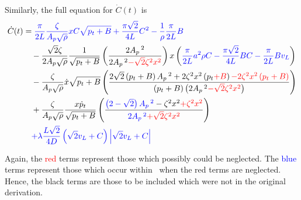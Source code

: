 Similarly, the full equation for $\dot{C}(t)$ is
~
\begin{equation*}
\begin{split}
    \dot{C}(t) &=
    \textcolor{Blue}{
    \frac{\pi}{2L} \frac{\zeta}{A_p \sqrt{\rho}} x C \sqrt{p_t + B}
    + \frac{\pi \sqrt{2}}{4 L} C^2
    - \frac{1}{\rho} \frac{\pi}{2L} B
    } \\ & \quad %
    - \frac{\sqrt{2} \zeta}{2 A_p \sqrt{\rho}} \frac{1}{\sqrt{p_t+B}} \left( \frac{2 A_p\,^2}{2 A_p\,^2 \textcolor{Red}{- \sqrt{2} \zeta^2 x^2}} \right) x \left(
    \textcolor{Blue}{
    \frac{\pi}{2L} a^2 \rho C
    - \frac{\pi \sqrt{2}}{4 L} B C
    - \frac{\pi}{2L} B v_L }
    \right)
    \\ & \quad %
    - \frac{\zeta}{A_p \sqrt{\rho}} \dot{x} \sqrt{p_t + B} \left( 
    \frac{ 2 \sqrt{2} \left( p_t + B \right) A_p\,^2 + 2 \zeta^2 x^2 \left( p_t \textcolor{red}{+ B} \right) \textcolor{Red}{- 2 \zeta^2 x^2 \left( p_t + B \right)} }
    { \left( p_t + B \right) \left( 2 A_p\,^2 \textcolor{Red}{- \sqrt{2} \zeta^2 x^2} \right) }
    \right)
    \\ & \quad %
    + \frac{\zeta}{A_p \sqrt{\rho}} \frac{x \dot{p}_t}{\sqrt{p_t+B}} \left( \frac{
    \textcolor{Blue}{\left( 2 - \sqrt{2} \right) A_p\,^2}
    - \zeta^2 x^2 \textcolor{Red}{+ \zeta^2 x^2}}{
    \textcolor{Blue}{2 A_p\,^2}
    \textcolor{Red}{+ \sqrt{2} \zeta^2 x^2}} \right)
    \\ & \quad %
    \textcolor{Blue}{
    + \lambda \frac{L \sqrt{2}}{4 D} \left( \sqrt{2} v_L + C \right) \left| \sqrt{2} v_L + C \right| }
\end{split}
\end{equation*}

Again, the \textcolor{Red}{red} terms represent those which possibly could be neglected. The \textcolor{Blue}{blue} terms represent those which occur within~\cite{Hos2015ModelPipe} when the red terms are neglected. Hence, the black terms are those to be included which were not in the original derivation.




